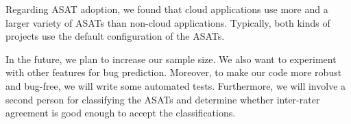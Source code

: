 \documentclass{seal_article}
\begin{document}
Regarding ASAT adoption, we found that cloud applications use more and a larger variety of ASATs than non-cloud applications. Typically, both kinds of projects use the default configuration of the ASATs.

In the future, we plan to increase our sample size. We also want to experiment with other features for bug prediction. Moreover, to make our code more robust and bug-free, we will write some automated tests. Furthermore, we will involve a second person for classifying the ASATs and determine whether inter-rater agreement is good enough to accept the classifications.




\end{document}
